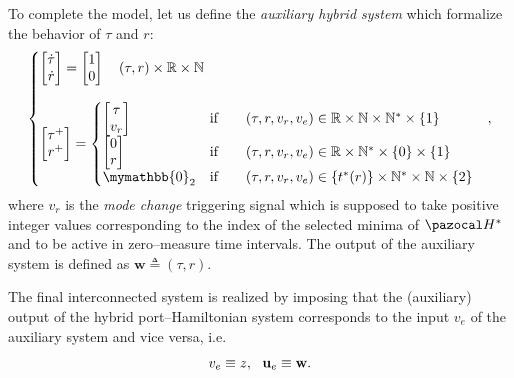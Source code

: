 To complete the model, let us define the \textit{auxiliary hybrid system} which formalize the behavior of $\tau$ and $r$:
%
\begin{equation}
	\left\{
	\begin{matrix*}[l]
		\begin{bmatrix}\dot{\tau}\\\dot{r}\end{bmatrix} = \begin{bmatrix}1\\0\end{bmatrix} \quad(\tau,r)\times\R\times\mathbb{N}\\\\
		\begin{bmatrix}\tau^+\\r^+\end{bmatrix} = 
			\left\{
				\begin{matrix*}[l]
					\begin{bmatrix}\tau\\v_r\end{bmatrix} &\text{if}&&(\tau,r,v_r,v_e)\in\R\times\mathbb{N}\times\mathbb{N}^*\times\{1\}\\
					\begin{bmatrix}0\\r\end{bmatrix} &\text{if}&&(\tau,r,v_r,v_e)\in\R\times\mathbb{N}^*\times\{0\}\times\{1\}\\
					\mymathbb{0}_2 &\text{if}&&(\tau,r,v_r,v_e)\in\{t^*(r)\}\times\mathbb{N}^*\times\mathbb{N}\times\{2\}\\	
				\end{matrix*}
			\right.
	\end{matrix*}
	\right.~~,
\end{equation}
%
where $v_r$ is the \textit{mode change} triggering signal which is supposed to take positive integer values corresponding to the index of the selected minima of $\Ha^*$ and to be active in zero--measure time intervals.
The output of the auxiliary system is defined as $\mathbf{w}\triangleq (\tau,r)$.

The final interconnected system is realized by imposing that the (auxiliary) output of the hybrid port--Hamiltonian system corresponds to the input $v_e$ of the auxiliary system and vice versa, i.e.
%
\begin{equation}
	v_e\equiv z,~~\mathbf{u}_e\equiv\mathbf{w}.
\end{equation}
%

